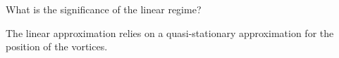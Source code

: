 What is the significance of the linear regime?

The linear approximation relies on a quasi-stationary approximation for the position of the vortices.  

